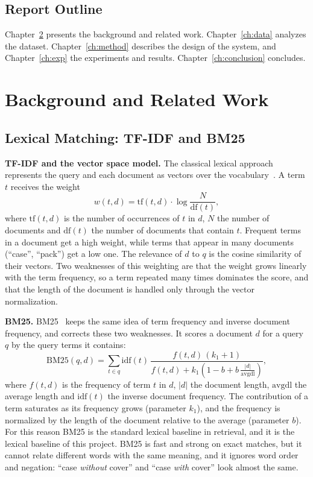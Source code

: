 \documentclass[12pt,a4paper]{report}
\begin{document}
\section{Report Outline}
Chapter~\ref{ch:background} presents the background and related work. Chapter~\ref{ch:data} analyzes the dataset. Chapter~\ref{ch:method} describes the design of the system, and Chapter~\ref{ch:exp} the experiments and results. Chapter~\ref{ch:conclusion} concludes.

\chapter{Background and Related Work}\label{ch:background}
\section{Lexical Matching: TF-IDF and BM25}
\textbf{TF-IDF and the vector space model.} The classical lexical approach represents the query and each document as vectors over the vocabulary~\cite{tfidf}. A term $t$ receives the weight
\[
w(t,d) = \mathrm{tf}(t,d)\cdot \log\frac{N}{\mathrm{df}(t)},
\]
where $\mathrm{tf}(t,d)$ is the number of occurrences of $t$ in $d$, $N$ the number of documents and $\mathrm{df}(t)$ the number of documents that contain $t$. Frequent terms in a document get a high weight, while terms that appear in many documents (``case'', ``pack'') get a low one. The relevance of $d$ to $q$ is the cosine similarity of their vectors. Two weaknesses of this weighting are that the weight grows linearly with the term frequency, so a term repeated many times dominates the score, and that the length of the document is handled only through the vector normalization.

\textbf{BM25.} BM25~\cite{bm25} keeps the same idea of term frequency and inverse document frequency, and corrects these two weaknesses. It scores a document $d$ for a query $q$ by the query terms it contains:
\[
\mathrm{BM25}(q,d) = \sum_{t \in q} \mathrm{idf}(t)\,
\frac{f(t,d)\,(k_1+1)}{f(t,d) + k_1\left(1 - b + b\,\frac{|d|}{\mathrm{avgdl}}\right)},
\]
where $f(t,d)$ is the frequency of term $t$ in $d$, $|d|$ the document length, $\mathrm{avgdl}$ the average length and $\mathrm{idf}(t)$ the inverse document frequency. The contribution of a term saturates as its frequency grows (parameter $k_1$), and the frequency is normalized by the length of the document relative to the average (parameter $b$). For this reason BM25 is the standard lexical baseline in retrieval, and it is the lexical baseline of this project. BM25 is fast and strong on exact matches, but it cannot relate different words with the same meaning, and it ignores word order and negation: ``case \emph{without} cover'' and ``case \emph{with} cover'' look almost the same.
\end{document}
